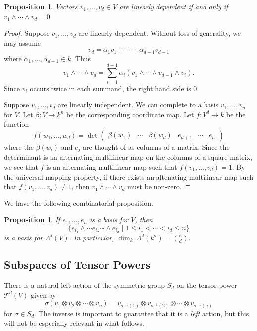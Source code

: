 \documentclass[12pt]{article}
\theoremstyle{plain}
\newtheorem{proposition}[theorem]{Proposition}
\theoremstyle{definition}
\theoremstyle{remark}
\numberwithin{equation}{section}
\begin{document}
\begin{proposition}
Vectors $v_1,\ldots , v_d \in V$ are linearly dependent
if and only if $v_1 \wedge \cdots \wedge v_d=0$.
\end{proposition}

\begin{proof}
Suppose $v_1,\ldots, v_d$ are linearly dependent.
Without loss of generality, we may assume
\[
v_d = \alpha_1 v_1 + \cdots + \alpha_{d-1} v_{d-1}
\]
where $\alpha_1, \ldots, \alpha_{d-1} \in k$.
Thus
\[
v_1 \wedge \cdots \wedge v_d =
\sum_{i=1}^{d-1} \alpha_i(v_1 \wedge \cdots \wedge v_{d-1} \wedge v_i).
\]
Since $v_i$ occurs twice in each summand, the right hand side is $0$.

Suppose $v_1,\ldots, v_d$ are linearly independent.
We can complete to a basis $v_1,\ldots,v_n$ for $V$.
Let $\beta : V \to k^n$ be the corresponding coordinate map.
Let $f : V^d \to k$ be the function
\[
f(w_1,\ldots,w_d) = \det
\begin{pmatrix} \beta(w_1) & \cdots & \beta(w_d)
& e_{d+1} & \cdots & e_n
\end{pmatrix}
\]
where the $\beta(w_i)$ and $e_j$ are thought of as columns of a matrix.
Since the determinant is an alternating multilinear map on the columns
of a square matrix, we see that $f$ is an alternating multilinear map
such that $f(v_1,\ldots,v_d)=1$.
By the universal mapping property, if there exists an altenating
multilinear map such that $f(v_1,\ldots,v_d) \ne 1$,
then $v_1 \wedge \cdots \wedge v_d$ must be non-zero.
\end{proof}

We have the following combinatorial proposition.

\begin{proposition}
If $e_1, \ldots, e_n$ is a basis for $V$, then
\[
\{
e_{i_1} \wedge \cdots e_{i_2} \cdots \wedge e_{i_d}
\mid
1 \le i_1 < \cdots < i_d \le n
\}
\]
is a basis for $\Lambda^d(V)$.
In particular, $\dim_k\ \Lambda^d(k^n)=\binom{n}{d}$.
\end{proposition}

\subsection{Subspaces of Tensor Powers}

There is a natural left action of the symmetric group $S_d$ on the
tensor power $\mathcal{T}^d(V)$ given by
\[
\sigma(v_1 \otimes v_2 \otimes \cdots \otimes v_n)
= v_{\sigma^{-1}(1)} \otimes v_{\sigma^{-1}(2)} \otimes \cdots
\otimes v_{\sigma^{-1}(n)}
\]
for $\sigma \in S_d$.
The inverse is important to guarantee that it is a \emph{left} action,
but this will not be especially relevant in what follows.
\end{document}
